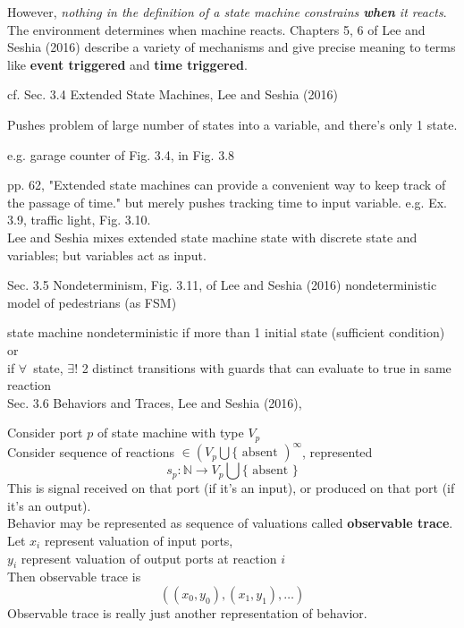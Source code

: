 \documentclass[10pt]{amsart}
\begin{document}
However, \emph{nothing in the definition of a state machine constrains \textbf{when} it reacts}. The environment determines when machine reacts. Chapters 5, 6 of Lee and Seshia (2016) \cite{LeSe2016} describe a variety of mechanisms and give precise meaning to terms like \textbf{event triggered} and \textbf{time triggered}.

cf. Sec. 3.4 Extended State Machines, Lee and Seshia (2016) \cite{LeSe2016}

Pushes problem of large number of states into a variable, and there's only 1 state.

e.g. garage counter of Fig. 3.4, in Fig. 3.8

pp. 62, "Extended state machines can provide a convenient way to keep track of the passage of time." but merely pushes tracking time to input variable. e.g. Ex. 3.9, traffic light, Fig. 3.10. \\

Lee and Seshia mixes extended state machine state with discrete state and variables; but variables act as input.

Sec. 3.5 Nondeterminism, Fig. 3.11, of Lee and Seshia (2016)\cite{LeSe2016} nondeterministic model of pedestrians (as FSM)

state machine nondeterministic if more than 1 initial state (sufficient condition) or \\
if $\forall \,$ state, $\exists !$ 2 distinct transitions with guards that can evaluate to true in same reaction \\

Sec. 3.6 Behaviors and Traces, Lee and Seshia (2016)\cite{LeSe2016},

Consider port $p$ of state machine with type $V_p$ \\
Consider sequence of reactions $\in (V_p \bigcup \lbrace \text{ absent })^{\infty}$, represented
\[
s_p : \mathbb{N} \to V_p \bigcup \lbrace \text{ absent } \rbrace 
\]
This is signal received on that port (if it's an input), or produced on that port (if it's an output). \\
Behavior may be represented as sequence of valuations called \textbf{observable trace}. \\
Let $x_i$ represent valuation of input ports, \\
$y_i$ represent valuation of output ports at reaction $i$\\
Then observable trace is 
\[
((x_0,y_0), (x_1, y_1), \dots)
\]
Observable trace is really just another representation of behavior.
\end{document}

